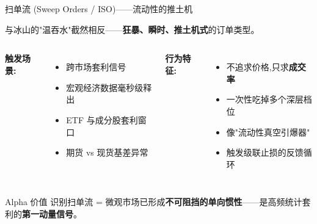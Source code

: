 \documentclass[10pt,aspectratio=169]{beamer}
\begin{document}
\begin{frame}{扫单流 (Sweep Orders / ISO)——流动性的推土机}

  与冰山的"温吞水"截然相反——\textbf{狂暴、瞬时、推土机式}的订单类型。

  \vfill

  \begin{columns}[T]
    \textbf{触发场景:}
    \begin{itemize}
      \item 跨市场套利信号
      \item 宏观经济数据毫秒级释出
      \item ETF 与成分股套利窗口
      \item 期货 vs 现货基差异常
    \end{itemize}

    \textbf{行为特征:}
    \begin{itemize}
      \item 不追求价格,只求\textbf{成交率}
      \item 一次性吃掉多个深层档位
      \item 像"流动性真空引爆器"
      \item 触发级联止损的反馈循环
    \end{itemize}
  \end{columns}

  \vfill

  \begin{alertblock}{Alpha 价值}
    识别扫单流 = 微观市场已形成\textbf{不可阻挡的单向惯性}——是高频统计套利的\textbf{第一动量信号}。
  \end{alertblock}

\end{frame}
\end{document}
